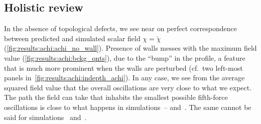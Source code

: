 


    


    

\subsection{Holistic review} %
    In the absence of topological defects, we see near on perfect correspondence between predicted and simulated scalar field $\chi=\breve{\chi}$ (\cref{fig:results:achi:achi_no_wall}). Presence of walls messes with the maximum field value (\cref{fig:results:achi:bckg_qnts}), due to the ``bump'' in the profile, a feature that is much more prominent when the walls are perturbed (cf.~two left-most panels in~\cref{fig:results:achi:indepth_achi}). %
    In any case, we see from the average squared field value that the overall oscillations are very close to what we expect. %
    The path the field can take that inhabits the smallest possible fifth-force oscillations is close to what happens in simulations~-- and~. The same cannot be said for simulations~ and~.
    